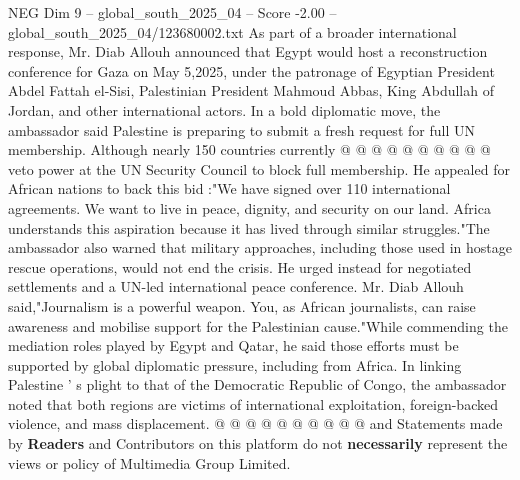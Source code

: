 \begin{textsample}{NEG Dim 9 – global\_south\_2025\_04 – Score -2.00 – global\_south\_2025\_04/123680002.txt}
As part of a broader international response, Mr.
Diab Allouh announced that Egypt would host a reconstruction conference for Gaza on May 5,2025, under the patronage of Egyptian President Abdel Fattah el-Sisi, Palestinian President Mahmoud Abbas, King Abdullah of Jordan, and other international actors.
In a bold diplomatic move, the ambassador said Palestine is preparing to submit a fresh request for full UN membership.
Although nearly 150 countries currently @ @ @ @ @ @ @ @ @ @ veto power at the UN Security Council to block full membership.
He appealed for African nations to back this bid :"We have signed over 110 international agreements.
We want to live in peace, dignity, and security on our land.
Africa understands this aspiration because it has lived through similar struggles."The ambassador also warned that military approaches, including those used in hostage rescue operations, would not end the crisis.
He urged instead for negotiated settlements and a UN-led international peace conference.
Mr.
Diab Allouh said,"Journalism is a powerful weapon.
You, as African journalists, can raise awareness and mobilise support for the Palestinian cause."While commending the mediation roles played by Egypt and Qatar, he said those efforts must be supported by global diplomatic pressure, including from Africa.
In linking Palestine ' s plight to that of the Democratic Republic of Congo, the ambassador noted that both regions are victims of international exploitation, foreign-backed violence, and mass displacement. @ @ @ @ @ @ @ @ @ @ and Statements made by \textbf{Readers} and Contributors on this platform do not \textbf{necessarily} represent the views or policy of Multimedia Group Limited.

\end{textsample}
